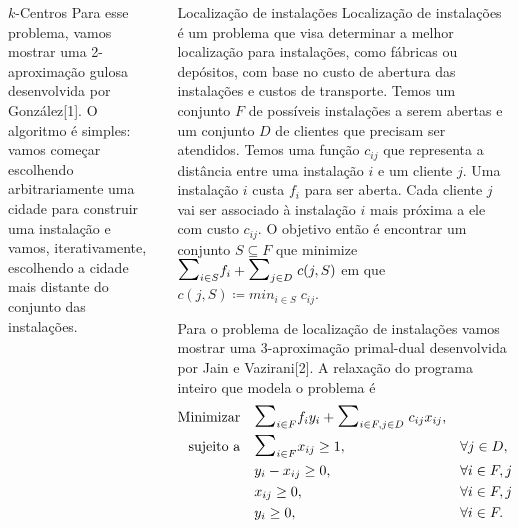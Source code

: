 \documentclass[final]{beamer}
\begin{document}
\begin{frame}[t]
\begin{columns}[t]
\begin{column}{0.47\paperwidth}
\begin{block}{$k$-Centros}
      Para esse problema, vamos mostrar uma 2-aproximação gulosa desenvolvida por González[1]. O algoritmo é simples: vamos começar escolhendo arbitrariamente uma cidade para construir uma instalação e vamos, iterativamente, escolhendo a cidade mais distante do conjunto das instalações.
    \end{block}
  \end{column}

  \begin{column}{0.47\paperwidth}
    \begin{block}{Localização de instalações}
      Localização de instalações é um problema que visa determinar a melhor localização para instalações, como fábricas ou depósitos, com base no custo de abertura das instalações e custos de transporte. Temos um conjunto $F$ de possíveis instalações a serem abertas e um conjunto $D$ de clientes que precisam ser atendidos. Temos uma função $c_{ij}$ que representa a distância entre uma instalação $i$ e um cliente $j$. Uma instalação $i$ custa $f_i$ para ser aberta. Cada cliente $j$ vai ser associado à instalação $i$ mais próxima a ele com custo $c_{ij}$. O objetivo então é encontrar um conjunto $S \subseteq F$ que minimize \( \scalebox{1.5}{$\sum$}_{i \in S} f_i + \scalebox{1.5}{$\sum$}_{j \in D} \; c(j,S) \) em que $c(j,S)\coloneqq min_{i\in S} \; c_{ij}$.

      Para o problema de localização de instalações vamos mostrar uma 3-aproximação primal-dual desenvolvida por Jain e Vazirani[2]. A relaxação do programa inteiro que modela o problema é 
      \begin{subequations}
        \begin{align}
          \text{Minimizar} \quad & \scalebox{1.5}{$\sum$}_{i \in F}f_iy_i + \scalebox{1.5}{$\sum$}_{i\in F,j\in D} \; c_{ij}x_{ij}, \\
          \text{sujeito a} \quad & \scalebox{1.5}{$\sum$}_{i\in F} x_{ij}\geq1, && \forall j \in D, \\
          &y_i - x_{ij} \geq 0, && \forall i\in F,j\in D, \\
          &x_{ij} \geq 0, && \forall i\in F,j\in D, \\
          &y_i \geq 0, && \forall i\in F.
        \end{align}
      \end{subequations}


\end{block}
\end{column}
\end{columns}
\end{frame}
\end{document}
